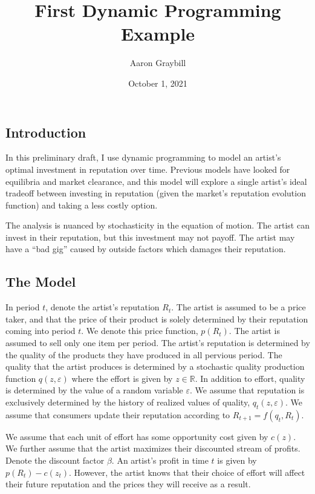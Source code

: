 \documentclass[
]{article}
\title{First Dynamic Programming Example}
\author{Aaron Graybill}
\date{October 1, 2021}
\begin{document}
\maketitle

\hypertarget{introduction}{%
\subsection{Introduction}\label{introduction}}

In this preliminary draft, I use dynamic programming to model an
artist's optimal investment in reputation over time. Previous models
have looked for equilibria and market clearance, and this model will
explore a single artist's ideal tradeoff between investing in reputation
(given the market's reputation evolution function) and taking a less
costly option.

The analysis is nuanced by stochasticity in the equation of motion. The
artist can invest in their reputation, but this investment may not
payoff. The artist may have a ``bad gig'' caused by outside factors
which damages their reputation.

\hypertarget{the-model}{%
\subsection{The Model}\label{the-model}}

In period \(t\), denote the artist's reputation \(R_t\). The artist is
assumed to be a price taker, and that the price of their product is
solely determined by their reputation coming into period \(t\). We
denote this price function, \(p(R_t)\). The artist is assumed to sell
only one item per period. The artist's reputation is determined by the
quality of the products they have produced in all pervious period. The
quality that the artist produces is determined by a stochastic quality
production function \(q(z,\varepsilon)\) where the effort is given by
\(z\in\mathbb{R}\). In addition to effort, quality is determined by the
value of a random variable \(\varepsilon\). We assume that reputation is
exclusively determined by the history of realized values of quality,
\(q_t(z,\varepsilon)\). We assume that consumers update their reputation
according to \(R_{t+1}=f(q_t,R_t)\).

We assume that each unit of effort has some opportunity cost given by
\(c(z)\). We further assume that the artist maximizes their discounted
stream of profits. Denote the discount factor \(\beta\). An artist's
profit in time \(t\) is given by \(p(R_t)-c(z_t)\). However, the artist
knows that their choice of effort will affect their future reputation
and the prices they will receive as a result.
\end{document}
